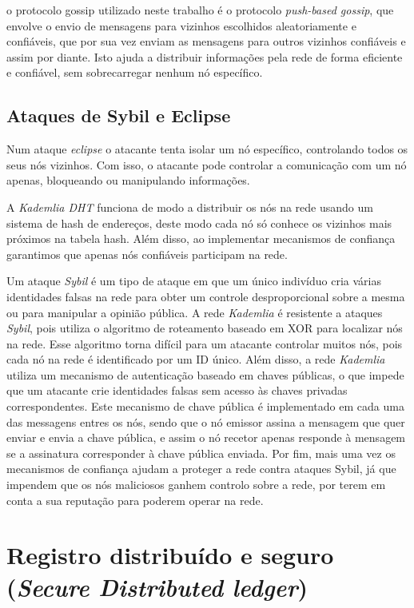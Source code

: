 \documentclass[conference]{IEEEtran}
\begin{document}
    o protocolo gossip utilizado neste trabalho é o protocolo \textit{push-based gossip}, que envolve o envio de mensagens para vizinhos escolhidos aleatoriamente e confiáveis, que por sua vez enviam as mensagens para outros vizinhos confiáveis e assim por diante. Isto ajuda a distribuir informações pela rede de forma eficiente e confiável, sem sobrecarregar nenhum nó específico.

    \subsection{Ataques de Sybil e Eclipse}

    Num ataque \textit{eclipse} o atacante tenta isolar um nó específico, controlando todos os seus nós vizinhos. Com isso, o atacante pode controlar a comunicação com um nó apenas, bloqueando ou manipulando informações.

    A \textit{Kademlia DHT} funciona de modo a distribuir os nós na rede usando um sistema de hash de endereços, deste modo cada nó só conhece os vizinhos mais próximos na tabela hash.
    Além disso, ao implementar mecanismos de confiança garantimos que apenas nós confiáveis participam na rede.

    Um ataque \textit{Sybil} é um tipo de ataque em que um único indivíduo cria várias identidades falsas na rede para obter um controle desproporcional sobre a mesma ou para manipular a opinião pública.
    A rede \textit{Kademlia} é resistente a ataques \textit{Sybil}, pois utiliza o algoritmo de roteamento baseado em XOR para localizar nós na rede. Esse algoritmo torna difícil para um atacante controlar muitos nós, pois cada nó na rede é identificado por um ID único. Além disso, a rede \textit{Kademlia} utiliza um mecanismo de autenticação baseado em chaves públicas, o que impede que um atacante crie identidades falsas sem acesso às chaves privadas correspondentes. Este mecanismo de chave pública é implementado em cada uma das messagens entres os nós, sendo que o nó emissor assina a mensagem que quer enviar e envia a chave pública, e assim o nó recetor apenas responde à mensagem se a assinatura corresponder à chave pública enviada.
    Por fim, mais uma vez os mecanismos de confiança ajudam a proteger a rede contra ataques Sybil, já que impendem que os nós maliciosos ganhem controlo sobre a rede, por terem em conta a sua reputação para poderem operar na rede.\\

    \section{Registro distribuído e seguro (\textit{Secure Distributed ledger})}
\end{document}

